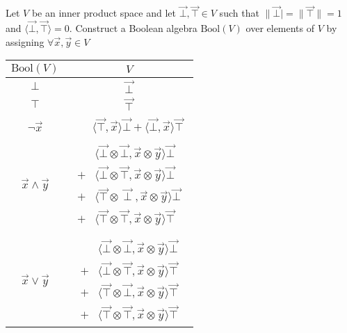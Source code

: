 \documentclass{article}
\begin{document}
Let $V$ be an inner product space and let $\vec{\bot}, \vec{\top} \in V$ such that
$\|\vec{\bot}| = \|\vec{\top}\| = 1$ and 
$\langle \vec{\bot}, \vec{\top} \rangle = 0$. Construct a Boolean algebra 
$\mathrm{Bool}(V)$ over elements of $V$ by assigning $\forall \vec{x}, \vec{y} \in V$

\begin{tabular}{c | c}
$\mathrm{Bool}(V)$ & $V$ \\
\hline
$\bot$                   & $\vec{\bot}$ \\
$\top$                   & $\vec{\top}$ \\
$\neg \vec{x}$           & $\!\begin{aligned} 
                                \phantom{+} & \langle \vec{\top}, \vec{x} \rangle \vec{\bot}
                                            + \langle \vec{\bot}, \vec{x} \rangle \vec{\top}
                              \end{aligned}$ \\
$\vec{x} \wedge \vec{y}$ & $\!\begin{aligned}
                             & \langle \vec{\bot} \otimes \vec{\bot}, 
                                       \vec{x} \otimes \vec{y} 
                               \rangle \vec{\bot} \\
                           + & \langle \vec{\bot} \otimes \vec{\top}, 
                                       \vec{x} \otimes \vec{y} 
                               \rangle \vec{\bot} \\
                           + & \langle \vec{\top} \otimes \vec{\perp}, 
                                       \vec{x} \otimes \vec{y} 
                               \rangle \vec{\bot} \\
                           + & \langle \vec{\top} \otimes \vec{\top}, 
                                       \vec{x} \otimes \vec{y} 
                               \rangle \vec{\top}
                           \end{aligned}$ \\
\\
$\vec{x} \vee \vec{y}$   & $\!\begin{aligned}
                             & \langle \vec{\bot} \otimes \vec{\bot}, 
                                       \vec{x} \otimes \vec{y} 
                               \rangle \vec{\bot} \\
                           + & \langle \vec{\bot} \otimes \vec{\top}, 
                                        \vec{x} \otimes \vec{y} 
                               \rangle \vec{\top} \\
                           + & \langle \vec{\top} \otimes \vec{\bot},
                                       \vec{x} \otimes \vec{y} 
                               \rangle \vec{\top} \\
                           + & \langle \vec{\top} \otimes \vec{\top}, 
                                       \vec{x} \otimes \vec{y} 
                               \rangle \vec{\top}
                           \end{aligned}$
\end{tabular}
\end{document}
